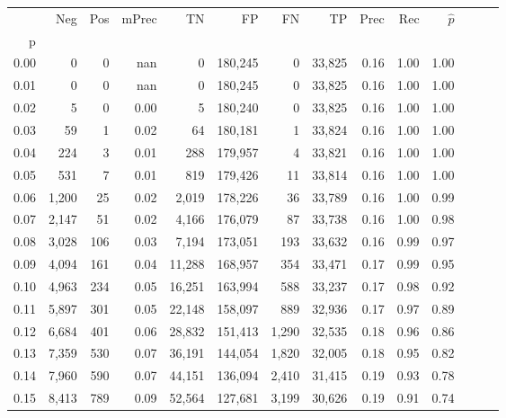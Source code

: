 \begin{tabular}{rrrrrrrrrrrrrr}
\toprule
{} &    Neg &    Pos & mPrec &       TN &       FP &      FN &      TP &  Prec &   Rec & $\hat{p}$ \\
p    &        &        &       &          &          &         &         &       &       &           \\
\midrule
0.00 &      0 &      0 &   nan &        0 &  180,245 &       0 &  33,825 &  0.16 &  1.00 &      1.00 \\
0.01 &      0 &      0 &   nan &        0 &  180,245 &       0 &  33,825 &  0.16 &  1.00 &      1.00 \\
0.02 &      5 &      0 &  0.00 &        5 &  180,240 &       0 &  33,825 &  0.16 &  1.00 &      1.00 \\
0.03 &     59 &      1 &  0.02 &       64 &  180,181 &       1 &  33,824 &  0.16 &  1.00 &      1.00 \\
0.04 &    224 &      3 &  0.01 &      288 &  179,957 &       4 &  33,821 &  0.16 &  1.00 &      1.00 \\
0.05 &    531 &      7 &  0.01 &      819 &  179,426 &      11 &  33,814 &  0.16 &  1.00 &      1.00 \\
0.06 &  1,200 &     25 &  0.02 &    2,019 &  178,226 &      36 &  33,789 &  0.16 &  1.00 &      0.99 \\
0.07 &  2,147 &     51 &  0.02 &    4,166 &  176,079 &      87 &  33,738 &  0.16 &  1.00 &      0.98 \\
0.08 &  3,028 &    106 &  0.03 &    7,194 &  173,051 &     193 &  33,632 &  0.16 &  0.99 &      0.97 \\
0.09 &  4,094 &    161 &  0.04 &   11,288 &  168,957 &     354 &  33,471 &  0.17 &  0.99 &      0.95 \\
0.10 &  4,963 &    234 &  0.05 &   16,251 &  163,994 &     588 &  33,237 &  0.17 &  0.98 &      0.92 \\
0.11 &  5,897 &    301 &  0.05 &   22,148 &  158,097 &     889 &  32,936 &  0.17 &  0.97 &      0.89 \\
0.12 &  6,684 &    401 &  0.06 &   28,832 &  151,413 &   1,290 &  32,535 &  0.18 &  0.96 &      0.86 \\
0.13 &  7,359 &    530 &  0.07 &   36,191 &  144,054 &   1,820 &  32,005 &  0.18 &  0.95 &      0.82 \\
0.14 &  7,960 &    590 &  0.07 &   44,151 &  136,094 &   2,410 &  31,415 &  0.19 &  0.93 &      0.78 \\
0.15 &  8,413 &    789 &  0.09 &   52,564 &  127,681 &   3,199 &  30,626 &  0.19 &  0.91 &      0.74 \\

\end{tabular}
